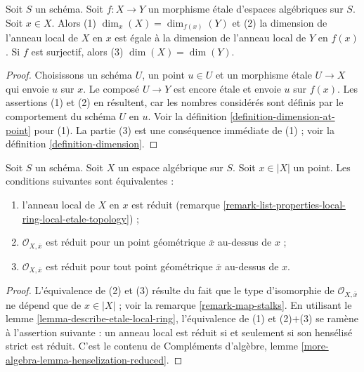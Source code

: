 \begin{lemma}
\label{lemma-dimension-decent-invariant-under-etale}
Soit $S$ un schéma. Soit $f : X \to Y$ un morphisme \'etale
d'espaces algébriques sur $S$. Soit $x \in X$. Alors
(1) $\dim_x(X) = \dim_{f(x)}(Y)$ et (2) la dimension de
l'anneau local de $X$ en $x$ est égale à la dimension de
l'anneau local de $Y$ en $f(x)$. Si $f$ est surjectif, alors
(3) $\dim(X) = \dim(Y)$.
\end{lemma}

\begin{proof}
Choisissons un schéma $U$, un point $u \in U$ et un morphisme \'etale
$U \to X$ qui envoie $u$ sur $x$. Le composé $U \to Y$
est encore \'etale et envoie $u$ sur $f(x)$. Les assertions (1) et (2)
en résultent, car les nombres considérés sont définis par le comportement
du schéma $U$ en $u$. Voir la
définition \ref{definition-dimension-at-point} pour (1). La partie (3) est
une conséquence immédiate de (1) ; voir la définition \ref{definition-dimension}.
\end{proof}

\begin{lemma}
\label{lemma-reduced-local-ring}
Soit $S$ un schéma. Soit $X$ un espace algébrique sur $S$.
Soit $x \in |X|$ un point. Les conditions suivantes sont équivalentes :
\begin{enumerate}
\item l'anneau local de $X$ en $x$ est réduit
(remarque \ref{remark-list-properties-local-ring-local-etale-topology}) ;
\item $\mathcal{O}_{X, \overline{x}}$ est réduit pour un point
géométrique $\overline{x}$ au-dessus de $x$ ;
\item $\mathcal{O}_{X, \overline{x}}$ est réduit pour tout point
géométrique $\overline{x}$ au-dessus de $x$.
\end{enumerate}
\end{lemma}

\begin{proof}
L'équivalence de (2) et (3) résulte du fait que le
type d'isomorphie de $\mathcal{O}_{X, \overline{x}}$ ne dépend que
de $x \in |X|$ ; voir la remarque \ref{remark-map-stalks}.
En utilisant le lemme \ref{lemma-describe-etale-local-ring},
l'équivalence de (1) et (2)$+$(3) se ramène à
l'assertion suivante : un anneau local est réduit si et seulement si
son hensélisé strict est réduit. C'est le contenu de
Compléments d'algèbre, lemme \ref{more-algebra-lemma-henselization-reduced}.
\end{proof}











